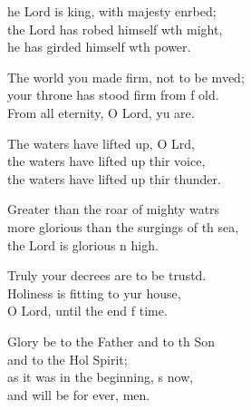 \settowidth{\versewidth}{more glorious than the surgings of the sea, *}
\begin{psalmverse}%
  \begin{patverse}
he Lord is king, with majesty enrbed;\Flex\\
    the Lord has robed himself w\pointup{\i}th might,\Med\\
    he has girded himself w\pointup{\i}th power.

The world you made firm, not to be mved;\Flex\\
    your throne has stood firm from f old.\Med\\
    From all eternity, O Lord, yu are.

The waters have lifted up, O Lrd,\Flex\\
    the waters have lifted up thir voice,\Med\\
    the waters have lifted up thir thunder.

Greater than the roar of mighty watrs\Flex\\
    more glorious than the surgings of th sea,\Med\\
    the Lord is glorious n high.

Truly your decrees are to be trustd.\Flex\\
    Holiness is fitting to yur house,\Med\\
    O Lord, until the end f time.

Glory be to the Father and to th Son\Med\\
    and to the Hol Spirit;\\
as it was in the beginning, \pointup{\i}s now,\Med\\
    and will be for ever, men.
  \end{patverse}
\end{psalmverse}
